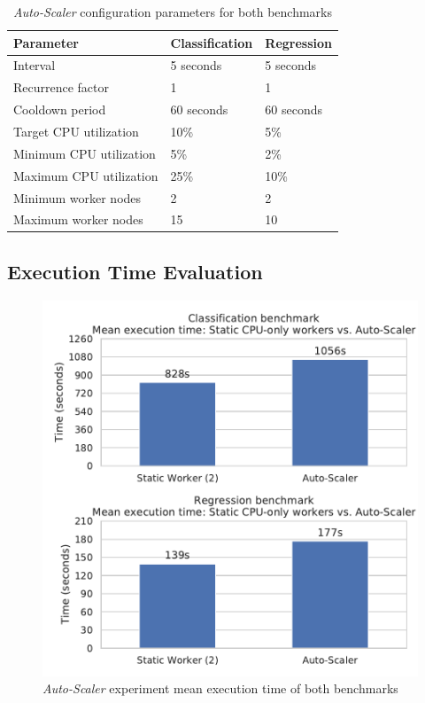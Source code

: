 \begin{table}[ht]
\centering
\begin{tabular}{@{}l|ll@{}}
\toprule
Parameter               & Classification & Regression \\ \midrule
Interval                & 5 seconds      & 5 seconds  \\
Recurrence factor       & 1              & 1          \\
Cooldown period         & 60 seconds     & 60 seconds \\
Target CPU utilization  & 10\%           & 5\%        \\
Minimum CPU utilization & 5\%            & 2\%       \\
Maximum CPU utilization & 25\%           & 10\%       \\
Minimum worker nodes    & 2              & 2         \\
Maximum worker nodes    & 15             & 10         \\ \bottomrule
\end{tabular}
\caption{\textit{Auto-Scaler} configuration parameters for both benchmarks}
\label{table:07_auto-scaler_config_parameter}
\end{table}


\subsection{Execution Time Evaluation}
\begin{figure}[h]
\centering
\includegraphics[scale=0.9]{images/07_evaluation/overall_auto-scaler}
\caption{\textit{Auto-Scaler} experiment mean execution time of both benchmarks}
\label{fig:07_auto-scaler_results}
\end{figure}

